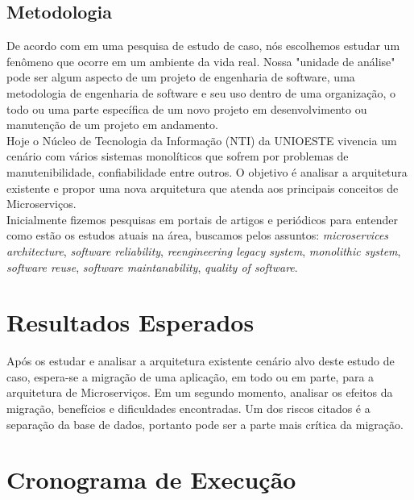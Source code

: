 \documentclass[12pt]{article}
\begin{document}
\subsection{Metodologia}
De acordo com \cite{PERRUNESON2012} em uma pesquisa de estudo de caso, nós escolhemos estudar um fenômeno que ocorre em um ambiente da vida real. Nossa "unidade de análise"\hspace{0.05cm} pode ser algum aspecto de um projeto de engenharia de software, uma metodologia de engenharia de software e seu uso dentro de uma organização, o todo ou uma parte específica de um novo projeto em desenvolvimento ou manutenção de um projeto em andamento.
\\Hoje o Núcleo de Tecnologia da Informação (NTI) da UNIOESTE vivencia um cenário com vários sistemas monolíticos que sofrem por problemas de manutenibilidade, confiabilidade entre outros. O objetivo é analisar a arquitetura existente e propor uma nova arquitetura que atenda aos principais conceitos de Microserviços.
\\Inicialmente fizemos pesquisas em portais de artigos e periódicos para entender como estão os estudos atuais na área, buscamos pelos assuntos: \textit{microservices architecture}, \textit{software reliability}, \textit{reengineering legacy system}, \textit{monolithic system}, \textit{software reuse}, \textit{software maintanability}, \textit{quality of software}.
 
\section{Resultados Esperados}

Após os estudar e analisar a arquitetura existente cenário alvo deste estudo de caso, espera-se a migração de uma aplicação, em todo ou em parte, para a arquitetura de Microserviços. Em um segundo momento, analisar os efeitos da migração, benefícios e dificuldades encontradas. Um dos riscos citados é a separação da base de dados, portanto pode ser a parte mais crítica da migração.

\section{Cronograma de Execução}
\end{document}
